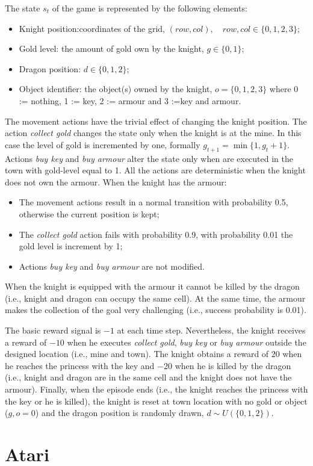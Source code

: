 \par
The state $s_t$ of the game is represented by the following elements:
\begin{itemize}
\item Knight position:coordinates of the grid, $(row,col), \quad row,col \in \{0,1,2,3\};$
\item Gold level: the amount of gold own by the knight, $g \in \{0,1\}$;
\item Dragon position: $d \in \{0,1,2\}$;
\item Object identifier: the object(s) owned by the knight, $o=\{0,1,2,3\}$ where 0 := nothing, 1 := key, 2 := armour and 3 :=key and armour.
\end{itemize}
The movement actions have the trivial effect of changing the knight position. The
action \emph{collect gold} changes the state only when the knight is at the mine. In this case the level of gold is incremented by one, formally $g_{t+1}= \min \{1,g_t + 1\}$. Actions \emph{buy key} and \emph{buy armour} alter the state only when are executed in the town with gold-level equal to 1. All the actions are deterministic when the knight does not own the armour. When the knight has the armour: 
\begin{itemize}
\item The movement actions result in a normal transition with probability 0.5, otherwise the current position is kept;
\item The \emph{collect gold} action fails with probability 0.9, \ie with probability 0.01 the gold level is increment by 1;
\item Actions \emph{buy key} and \emph{buy armour} are not modified.
\end{itemize}
When the knight is equipped with the armour it cannot be killed by the dragon (i.e., knight and dragon can occupy the same cell). At the same time, the armour makes the collection of the goal very challenging (i.e., success probability is 0.01).\par
The basic reward signal is $-1$ at each time step. Nevertheless, the knight receives a reward of $-10$ when he executes \emph{collect gold}, \emph{buy key} or \emph{buy armour} outside the designed location (i.e., mine and town).  The knight obtains a reward of $20$ when he reaches the princess with the key and $-20$ when he is killed by the dragon (i.e., knight and dragon are in the same cell and the knight
does not have the armour). Finally, when the episode ends (i.e., the knight reaches the princess with the key or he is killed), the knight is reset at town location with no gold or object ($g,o= 0$) and the dragon position is randomly drawn, $d \sim U(\{0,1,2\})$.
\section{Atari}		 \label{sec:atari_experiments}